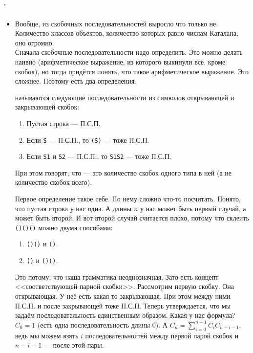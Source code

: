 \documentclass{article}
\begin{document}
    \subparagraph{.}
    \begin{itemize}
        \item[]
        \begin{Comment}
            Вообще, из скобочных последовательностей выросло что только не. Количество классов объектов, количество которых равно числам Каталана, оно огромно.\\
            Сначала скобочные последовательности надо определить. Это можно делать наивно (арифметическое выражение, из которого выкинули всё, кроме скобок), но тогда придётся понять, что такое арифметическое выражение. Это сложнее. Поэтому есть два определения.
        \end{Comment}
        \dfn {} называются следующие последовательности из символов открывающей и закрывающей скобок:
        \begin{enumerate}
            \item Пустая строка --- П.С.П.
            \item Если \texttt{S} --- П.С.П., то \texttt{(S)} --- тоже П.С.П.
            \item Если \texttt{S1} и \texttt{S2} --- П.С.П., то \texttt{S1S2} --- тоже П.С.П.
        \end{enumerate}
        \dfn При этом говорят, что  --- это количество скобок одного типа в ней (а не количество скобок всего).
        \begin{Comment}
            Первое определение такое себе. По нему сложно что-то посчитать. Понято, что пустая строка у нас одна. А длины $n$ у нас может быть первый случай, а может быть второй. И вот второй случай считается плохо, потому что склеить \texttt{()()()} можно двумя способами:
            \begin{enumerate}
                \item \texttt{()()} и \texttt{()}.
                \item \texttt{()} и \texttt{()()}.
            \end{enumerate}
            Это потому, что наша грамматика неоднозначная. Зато есть концепт <<соответствующей парной скобки>>. Рассмотрим первую скобку. Она открывающая. У неё есть какая-то закрывающая. При этом между ними П.С.П. и после закрывающей тоже П.С.П. Теперь утверждается, что мы задаём последовательность единственным образом. Какая у нас формула? $C_0=1$ (есть одна последовательность длины 0). А $C_n=\sum\limits_{i=0}^{n-1}C_iC_{n-i-1}$, ведь мы можем взять $i$ последовательностей между первой парой скобок и $n-i-1$ --- после этой пары.

\end{Comment}
\end{itemize}
\end{document}
